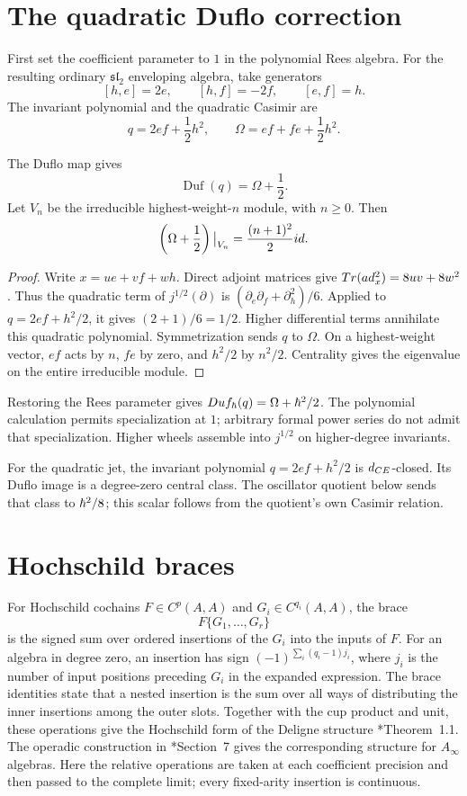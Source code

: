 \section{The quadratic Duflo correction}
First set the coefficient parameter to $1$ in the polynomial Rees algebra.
For the resulting ordinary $\mathfrak{sl}_2$ enveloping algebra, take generators
\[
 [h,e]=2e,
 \qquad
 [h,f]=-2f,
 \qquad
 [e,f]=h.
\]
The invariant polynomial and the quadratic Casimir are
\[
 q=2ef+\frac12h^2,
 \qquad
 \Omega=ef+fe+\frac12h^2.
\]

\begin{calculation}
The Duflo map gives
\[
 \operatorname{Duf}(q)=\Omega+\frac12.
\]
Let $V_n$ be the irreducible highest-weight-$n$ module, with $n\ge0$.
Then
\[
 \left(\Omega+\frac12\right)\big|_{V_n}
 =\frac{(n+1)^2}{2}id.
\]
\end{calculation}
\begin{proof}
Write $x=ue+vf+wh$.  Direct adjoint matrices give
$Tr(ad_x^2)=8uv+8w^2$.
Thus the quadratic term of $j^{1/2}(\partial)$ is
$(\partial_e\partial_f+\partial_h^2)/6$.
Applied to $q=2ef+h^2/2$, it gives $(2+1)/6=1/2$.
Higher differential terms annihilate this quadratic polynomial.
Symmetrization sends $q$ to $\Omega$.
On a highest-weight vector, $ef$ acts by $n$, $fe$ by zero,
and $h^2/2$ by $n^2/2$.
Centrality gives the eigenvalue on the entire irreducible module.
\end{proof}

Restoring the Rees parameter gives $Duf_\hbar(q)=\Omega+\hbar^2/2$.  The polynomial calculation permits specialization at $1$; arbitrary formal power series do not admit that specialization.  Higher wheels assemble into $j^{1/2}$ on higher-degree invariants.


For the quadratic jet, the invariant polynomial $q=2ef+h^2/2$ is
$d_{CE}$-closed.  Its Duflo image is a degree-zero central class.
The oscillator quotient below sends that class to $\hbar^2/8$;
this scalar follows from the quotient's own Casimir relation.

\section{Hochschild braces}
For Hochschild cochains $F\in C^p(A,A)$ and $G_i\in C^{q_i}(A,A)$, the brace
\[
 F\{G_1,\ldots,G_r\}
\]
is the signed sum over ordered insertions of the $G_i$ into the inputs
of $F$.  For an algebra in degree zero, an insertion has sign
$(-1)^{\sum_i(q_i-1)j_i}$, where $j_i$ is the number of input
positions preceding $G_i$ in the expanded expression.
The brace identities state that a nested insertion is the sum over
all ways of distributing the inner insertions among the outer slots.
Together with the cup product and unit, these operations give the
Hochschild form of the Deligne structure
\cite{McClureSmith}*{Theorem~1.1}.
The operadic construction in
\cite{KontsevichSoibelmanDeligne}*{Section~7} gives the corresponding
structure for $A_\infty$ algebras.  Here the relative operations are
taken at each coefficient precision and then passed to the complete
limit; every fixed-arity insertion is continuous.

